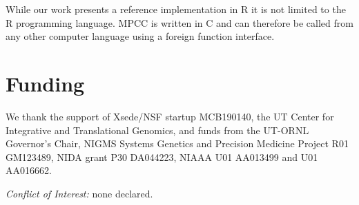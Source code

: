 \documentclass{bioinfo}
\begin{document}
While our work presents a reference implementation in R it is not
limited to the R programming language. MPCC is written in C and can
therefore be called from any other computer language using a foreign
function interface.

\section*{Funding}

We thank the support of Xsede/NSF startup MCB190140, the UT Center for
Integrative and Translational Genomics, and funds from the UT-ORNL
Governor's Chair, NIGMS Systems Genetics and Precision Medicine
Project R01 GM123489, NIDA grant P30 DA044223, NIAAA U01 AA013499 and
U01 AA016662.

\textit{Conflict of Interest:} none declared.

\vspace*{-5mm}


\end{document}
